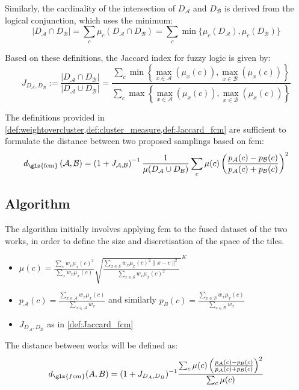 \begin{toReview}
\begin{definition}
	\noindent Similarly, the cardinality of the intersection of $D_\mathcal{A}$ and $D_\mathcal{B}$ is derived from the logical conjunction, which uses the minimum:
	$$|D_\mathcal{A} \cap D_\mathcal{B}| = \sum_c \mu_c(D_\mathcal{A} \cap D_\mathcal{B}) = \sum_c \min\{\mu_c(D_\mathcal{A}), \mu_c(D_\mathcal{B})\} $$

	\noindent Based on these definitions, the Jaccard index for fuzzy logic is given by:
	\begin{equation*}
		J_{D_\mathcal{A},D_\mathcal{B}} :=
		\frac{
			\left|D_\mathcal{A} \cap D_\mathcal{B}\right|
		}{
			\left|D_\mathcal{A} \cup D_\mathcal{B}\right|
		}
		= \frac{
			\sum_c \min \left\{
				\max_{x\in \mathcal{A}}\left(
					\mu_x\left(c\right)
				\right), \max_{x\in \mathcal{B}}\left(
					\mu_x\left(c\right)
				\right)
			\right\}
		}{
			\sum_c \max\left\{
				\max_{x\in \mathcal{A}}\left(
					\mu_x\left(c\right)
				\right),\max_{x\in \mathcal{B}}\left(
					\mu_x\left(c\right)
				\right)
			\right\}
		}
	\end{equation*}
\end{definition}
\end{toReview}

\noindent The definitions provided in \cref{def:weightovercluster,def:cluster_measure,def:Jaccard_fcm} are sufficient to formulate the distance between two proposed samplings based on \gls{fcm}:
\[
d_{\text{\gls{fcm}}}\left(\mathcal{A},\mathcal{B}\right) = \left(1+J_{\mathcal{A},\mathcal{B}}\right)^{-1}\frac{1}{\mu(D_\mathcal{A} \cup D_\mathcal{B})} \sum_c \mu(c) \left(\frac{p_\mathcal{A}(c) - p_\mathcal{B}(c)}{p_\mathcal{A}(c) + p_\mathcal{B}(c)}\right)^2
\]


\subsection{Algorithm}
The algorithm initially involves applying \gls{fcm} to the fused dataset of the two works, in order to define the size and discretisation of the space of the tiles.
\begin{itemize}
	\item $ \mu(c) = \frac{\sum_x w_x\mu_x(c)^2}{\sum_x w_x\mu_x(c)}\sqrt{\frac{\sum_{x\in\mathcal{S}} w_x\mu_x(c)^2 \|x-c\|^2}{\sum_{x\in\mathcal{S}}w_x \mu_x(c)^2}\,}^K $
	\item $ p_\mathcal{A}(c) = \frac{\sum_{x\in \mathcal{A}} w_x\mu_x(c)}{\sum_{x\in \mathcal{A}}w_x} $ and similarly $ p_B(c) = \frac{\sum_{x\in \mathcal{B}} w_x\mu_x(c)}{\sum_{x\in \mathcal{B}}w_x} $
	\item $ J_{D_\mathcal{A}, D_\mathcal{B}} $ as in \cref{def:Jaccard_fcm}
\end{itemize}
The distance between works will be defined as:
\begin{equation}
\label{eq:fuzzy_distance}
	d_{\gls{fcm}}(A, B) = (1 + J_{D_A, D_B})^{-1}\frac{\sum_c  \mu(c)\left(\frac{p_\mathcal{A}(c)-p_\mathcal{B}(c)}{p_\mathcal{A}(c)+p_\mathcal{B}(c)}\right)^2}{\sum_c \mu(c)}
\end{equation}

